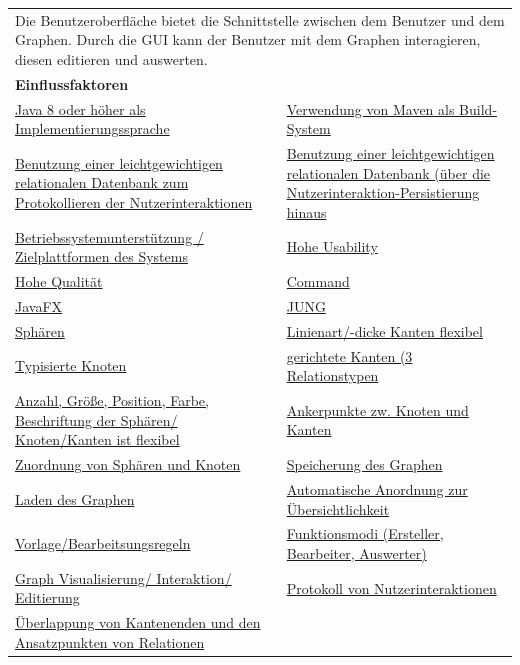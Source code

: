 \documentclass[enabledeprecatedfontcommands,fontsize=11pt,paper=a4,twoside]{scrartcl}
\newcounter{one}
\begin{document}
\newpage
\hspace{-0.65cm}
\begin{tabular} {|p{8cm} p{8cm}|}
	\hline
	\rowcolor{prob}\multicolumn{2}{|l|}{\parbox{16cm}{\textbf{13: Benutzeroberfläche}}} \\  \hline\hline 
	\multicolumn{2}{|l|}{\parbox{16cm}{Die Benutzeroberfläche bietet die Schnittstelle zwischen dem Benutzer und dem Graphen. Durch die GUI kann der Benutzer mit dem Graphen interagieren, diesen editieren und auswerten.}}\rule{0pt}{5ex}\\ [1ex] \hline
	\multicolumn{2}{|l|}{\textbf{Einflussfaktoren}}\\
	\hyperlink{b}{Java 8 oder höher als Implementierungssprache} &
	\hyperlink {c}{Verwendung von Maven als Build-System} \\
	\hyperlink {d}{Benutzung einer leichtgewichtigen relationalen Datenbank zum Protokollieren der Nutzerinteraktionen}&
	\hyperlink {e}{Benutzung einer leichtgewichtigen relationalen Datenbank (über die Nutzerinteraktion-Persistierung hinaus}\\
	\hyperlink {f}{Betriebssystemunterstützung / Zielplattformen des Systems}&
	\hyperlink {g}{Hohe Usability}\\
	\hyperlink {h}{Hohe Qualität}&
	\hyperlink {i}{Command} \\
	\hyperlink {j}{JavaFX}&
	\hyperlink {k}{JUNG} \\
	\hyperlink {n}{Sphären} &
	\hyperlink {o}{Linienart/-dicke Kanten flexibel}\\
	\hyperlink {p}{Typisierte Knoten} &
	\hyperlink {q}{gerichtete Kanten (3 Relationstypen} \\
	\hyperlink {r}{Anzahl, Größe, Position, Farbe, Beschriftung der Sphären/ Knoten/Kanten ist flexibel} &
	\hyperlink {s}{Ankerpunkte zw. Knoten und Kanten} \\
	\hyperlink {t}{Zuordnung von Sphären und Knoten} &
	\hyperlink {v}{Speicherung des Graphen} \\
	\hyperlink {w}{Laden des Graphen} &
	\hyperlink {x}{Automatische Anordnung zur Übersichtlichkeit} \\
	\hyperlink {y}{Vorlage/Bearbeitsungsregeln} &
	\hyperlink {z}{Funktionsmodi (Ersteller, Bearbeiter, Auswerter)} \\
	\hyperlink {aa}{Graph Visualisierung/ Interaktion/ Editierung}&
	\hyperlink {bb}{Protokoll von Nutzerinteraktionen} \\
	\hyperlink {cc}{Überlappung von Kantenenden und den Ansatzpunkten von Relationen} &

\end{tabular}
\end{document}
